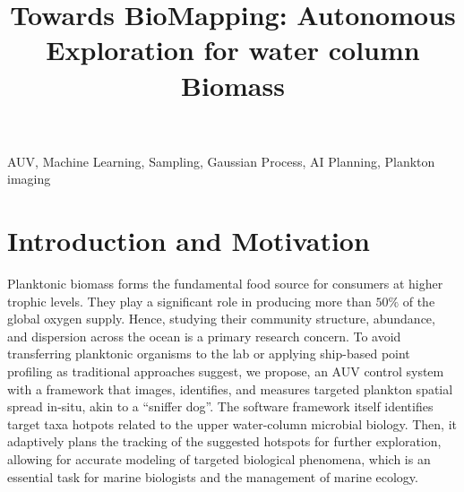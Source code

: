 \documentclass[conference]{IEEEtran}
\begin{document}
\title{Towards BioMapping: Autonomous Exploration for water column Biomass\\
}

\author{
}
\maketitle



\begin{IEEEkeywords}
AUV, Machine Learning, Sampling, Gaussian Process, AI Planning, Plankton imaging
\end{IEEEkeywords}

\section{Introduction and Motivation}

Planktonic biomass forms the fundamental food source for consumers at
higher trophic levels. They play a significant role in producing more
than $50\%$ of the global oxygen supply. Hence, studying their
community structure, abundance, and dispersion across the ocean is a
primary research concern. To avoid transferring planktonic organisms
to the lab or applying ship-based point profiling as traditional
approaches suggest, we propose, an AUV control system with a framework
that images, identifies, and measures targeted plankton spatial spread
in-situ, akin to a ``sniffer dog''.  The software framework itself
identifies target taxa hotpots related to the upper water-column
microbial biology. Then, it adaptively plans the tracking of the
suggested hotspots for further exploration, allowing for accurate
modeling of targeted biological phenomena, which is an essential task
for marine biologists and the management of marine ecology.
\end{document}
